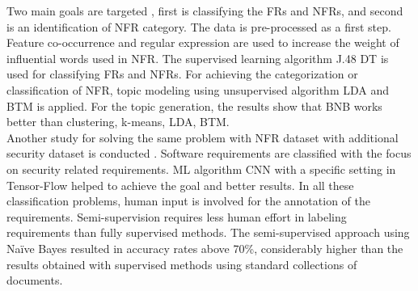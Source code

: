 	Two main goals are targeted \cite{Abad},
first is classifying the FRs and NFRs, and second is an identification of NFR category. The data is
pre-processed as a first step. Feature co-occurrence and regular expression are used to increase
the weight of influential words used in NFR. The supervised learning algorithm J.48 DT is used
for classifying FRs and NFRs. For achieving the categorization or classification of NFR,
topic modeling using unsupervised algorithm LDA and BTM is applied. For the topic generation, the results show  that BNB works better than clustering, k-means, LDA, BTM. \\


	Another study for solving the same problem with NFR dataset with additional security dataset is conducted \cite{Dekhtyar}.
Software requirements are classified with the focus on security related requirements. ML algorithm
CNN with a specific setting in Tensor-Flow helped to achieve the goal and better results. In all
these classification problems, human input is involved for the annotation of the requirements.
Semi-supervision requires less human effort in labeling requirements than fully supervised
methods. The semi-supervised approach \cite{Casamayor} using Naïve Bayes resulted in accuracy rates
above 70\%, considerably higher than the results obtained with supervised methods using
standard collections of documents.
